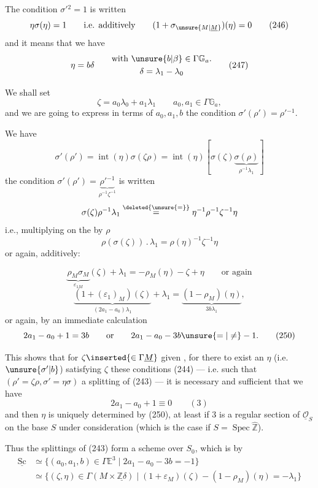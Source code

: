 The condition $\sigma'{}^2=1$ is written
\[
\eta\sigma(\eta)=1
\qquad\text{i.e. additively}\qquad
(1+\sigma_{\unsure{M|\underline M}})(\eta)=0
\tag{246}
\]
and it means that we have
\[
\eta=b\delta\qquad
\begin{gathered}
\text{with }\unsure{b|\beta}\in\Gamma\mathbb G_a.\\
\delta=\lambda_1-\lambda_0
\end{gathered}
\tag{247}
\]

We shall set
\[
\zeta=a_0\lambda_0+a_1\lambda_1
\qquad a_0,a_1\in\Gamma\mathbb G_a,
\tag{248}
\]
and we are going to express in terms of $a_0,a_1,b$ the condition
$\sigma'(\rho')=\rho'{}^{-1}$.

We have
\[
\sigma'(\rho')=\operatorname{int}(\eta)\sigma(\zeta\rho)
=\operatorname{int}(\eta)
\left[\sigma(\zeta)\underbrace{\sigma(\rho)}_{\rho^{-1}\lambda_1}\right]
\]
the condition
$\sigma'(\rho')=\underbrace{\rho'{}^{-1}}_{\rho^{-1}\zeta^{-1}}$
is written
\[
\sigma(\zeta)\rho^{-1}\lambda_1
\overset{\deleted{\unsure{=}}}{=}
\eta^{-1}\rho^{-1}\zeta^{-1}\eta
\]
i.e., multiplying on the  by $\rho$
\[
\rho(\sigma(\zeta))\mathbin{.}\lambda_1
=\rho(\eta)^{-1}\zeta^{-1}\eta
\]
or again, additively:



\[
\underbrace{\rho_M\sigma_M}_{\varepsilon_{1M}}(\zeta)+\lambda_1
=-\rho_M(\eta)-\zeta+\eta
\qquad\text{or again}
\]
\[
\underbrace{(1+(\varepsilon_1)_M)(\zeta)}_{(2a_1-a_0)\lambda_1}
+\lambda_1
=\underbrace{(1-\rho_M)(\eta)}_{3b\lambda_1},
\tag{249}
\]
or again, by an immediate calculation
\[
2a_1-a_0+1=3b
\qquad\text{or}\qquad
2a_1-a_0-3b\unsure{=|\ne}-1.
\tag{250}
\]

This shows that for $\zeta\inserted{\in\Gamma\underline M}$ given
, for there to exist an $\eta$
(i.e. $\unsure{\sigma'|b}$) satisfying  $\zeta$ these
conditions (244) --- i.e.  such that
$(\rho'=\zeta\rho,\sigma'=\eta\sigma)$  a splitting of
(243) --- it is necessary and sufficient that we have
\[
2a_1-a_0+1\equiv0\qquad(3)
\tag{251}
\]
and then $\eta$ is uniquely determined by (250), at least if $3$ is
a regular section of $\underline{\mathcal O}_S$ on the base $S$
under consideration (which is the case if $S=\operatorname{Spec}\widehat{\mathbb Z}$).

Thus the splittings of (243) form a scheme
 over $S_0$, which is
  by
\[
\begin{aligned}
\underline{\mathrm{Sc}}
&\simeq
\{(a_0,a_1,b)\in\Gamma\mathbb E^3
  \mid 2a_1-a_0-3b=-1\}\\
&\simeq
\{(\zeta,\eta)\in\Gamma(M\times\underline{\mathbb Z\delta})
  \mid(1+\varepsilon_{M})(\zeta)
       -(1-\rho_M)(\eta)=-\lambda_1\}
\end{aligned}
\tag{252}
\]

